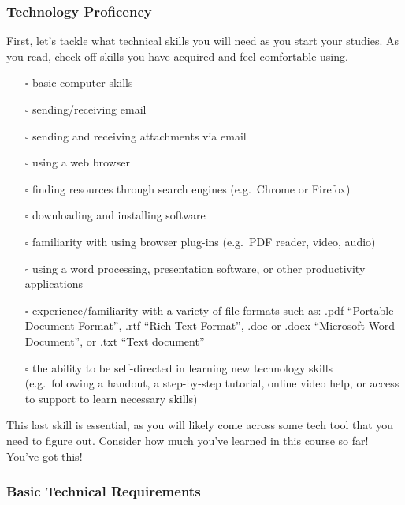 \documentclass[
]{book}
\providecommand{\tightlist}{%
  \setlength{\itemsep}{0pt}\setlength{\parskip}{0pt}}
\theoremstyle{definition}
\theoremstyle{definition}
\theoremstyle{definition}
\theoremstyle{definition}
\theoremstyle{remark}
\begin{document}
\hypertarget{technology-proficency}{%
\subsubsection*{Technology Proficency}\label{technology-proficency}}

First, let's tackle what technical skills you will need as you start your studies. As you read, check off skills you have acquired and feel comfortable using.

\begin{itemize}
\tightlist
\item[$\square$]
  basic computer skills
\item[$\square$]
  sending/receiving email
\item[$\square$]
  sending and receiving attachments via email
\item[$\square$]
  using a web browser
\item[$\square$]
  finding resources through search engines (e.g.~Chrome or Firefox)
\item[$\square$]
  downloading and installing software
\item[$\square$]
  familiarity with using browser plug-ins (e.g.~PDF reader, video, audio)
\item[$\square$]
  using a word processing, presentation software, or other productivity applications
\item[$\square$]
  experience/familiarity with a variety of file formats such as: .pdf ``Portable Document Format'', .rtf ``Rich Text Format'', .doc or .docx ``Microsoft Word Document'', or .txt ``Text document''
\item[$\square$]
  the ability to be self-directed in learning new technology skills (e.g.~following a handout, a step-by-step tutorial, online video help, or access to support to learn necessary skills)
\end{itemize}

This last skill is essential, as you will likely come across some tech tool that you need to figure out. Consider how much you've learned in this course so far! You've got this!

\hypertarget{basic-technical-requirements}{%
\subsubsection*{Basic Technical Requirements}\label{basic-technical-requirements}}
\end{document}
